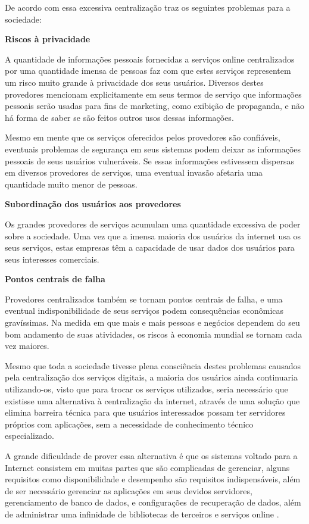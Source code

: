 De acordo com \cite{shak2015} essa excessiva centralização traz os seguintes
problemas para a sociedade:

\textbf{Riscos à privacidade}

A quantidade de informações pessoais fornecidas a serviços online
centralizados por uma quantidade imensa de pessoas faz com que estes serviços
representem um risco muito grande à privacidade dos seus usuários. Diversos
destes provedores mencionam explicitamente em seus termos de serviço que
informações pessoais serão usadas para fins de marketing, como exibição de
propaganda, e não há forma de saber se são feitos outros usos dessas
informações.

Mesmo em mente que os serviços oferecidos pelos provedores são
confiáveis, eventuais problemas de segurança em seus sistemas podem deixar as
informações pessoais de seus usuários vulneráveis. Se essas informações estivessem dispersas em
diversos provedores de serviços, uma eventual invasão afetaria uma quantidade
muito menor de pessoas.

\textbf{Subordinação dos usuários aos provedores}

Os grandes provedores de serviços acumulam uma quantidade excessiva de poder
sobre a sociedade. Uma vez que a imensa maioria dos usuários da internet usa
os seus serviços, estas empresas têm a capacidade de usar dados dos usuários para
seus interesses comerciais.

\textbf{Pontos centrais de falha}

Provedores centralizados também se tornam pontos centrais de falha, e uma
eventual indisponibilidade de seus serviços podem consequências econômicas
gravíssimas. Na medida em que mais e mais pessoas e negócios dependem do seu
bom andamento de suas atividades, os riscos à economia mundial se tornam cada
vez maiores.

Mesmo que toda a sociedade tivesse plena consciência destes problemas causados
pela centralização dos serviços digitais, a maioria dos usuários ainda
continuaria utilizando-os, visto que para trocar os serviços utilizados, seria
necessário que existisse uma alternativa à centralização da internet, através
de uma solução que elimina barreira técnica para que usuários interessados
possam ter servidores próprios com aplicações, sem a necessidade de conhecimento
técnico especializado.

A grande dificuldade de prover essa alternativa é que os sistemas voltado para a
Internet consistem em muitas partes que são complicadas de gerenciar, alguns
requisitos como disponibilidade e desempenho são requisitos indispensáveis, além de ser
necessário gerenciar as aplicações em seus devidos servidores, gerenciamento de
banco de dados, e configurações de recuperação de dados, além de administrar uma
infinidade de bibliotecas de terceiros e serviços online \cite{6265084}.


